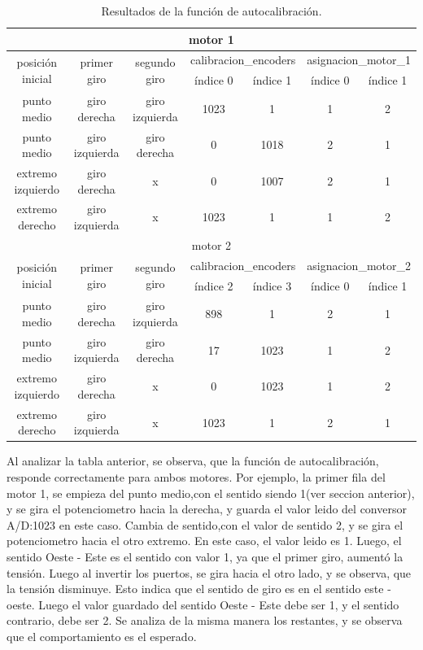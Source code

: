 \begin{table}[ht!]
	\begin{tabular}{|c|c|c|c|c|c|c|}
		\hline 
		\multicolumn{7}{|c|}{motor 1} \\
		\hline 
		\multirow{2}{*}{posición inicial} & 
		\multirow{2}{*}{primer giro} &\multirow{2}{*}{segundo giro} & \multicolumn{2}{l|}{calibracion\_encoders}& \multicolumn{2}{l|}{asignacion\_motor\_1} \\ \cline{4-7} 
		   & & & índice 0 &índice 1 &índice 0 &  índice 1 \\
		 \hline 
	      punto medio & giro derecha & giro izquierda & 1023 & 1 & 1 & 2 \\
	     \hline 
		 punto medio & giro izquierda & giro derecha & 0 & 1018 & 2 & 1 \\
		 \hline 	
		extremo izquierdo & giro derecha & x & 0 & 1007 & 2 & 1 \\
		\hline 
	    extremo derecho & giro izquierda & x & 1023 & 1 & 1 & 2 \\
		\hline 	
		\hline
		
		\multicolumn{7}{|c|}{motor 2} \\
		\hline 
		
		\multirow{2}{*}{posición inicial} & 
		\multirow{2}{*}{primer giro} &\multirow{2}{*}{segundo giro} & \multicolumn{2}{l|}{calibracion\_encoders}& \multicolumn{2}{l|}{asignacion\_motor\_2} \\ \cline{4-7} 
		   & & & índice 2 &índice 3 &índice 0 &  índice 1 \\ 
		\hline 
		 punto medio & giro derecha & giro izquierda & 898 & 1 & 2 & 1  \\
		\hline 
		 punto medio & giro izquierda & giro derecha & 17 & 1023 & 1 &2  \\
		\hline 	
		 extremo izquierdo & giro derecha & x & 0 & 1023 & 1 &2  \\
		\hline 
		 extremo derecho & giro izquierda & x & 1023 & 1 & 2 & 1 \\
		\hline
		\end{tabular}
	\caption{Resultados de la función de autocalibración.}
	\label{tab:resultados_autocalibracion}
\end{table}

Al analizar la tabla anterior, se observa, que la función de autocalibración, responde correctamente para ambos motores. Por ejemplo, la primer fila del motor 1, se empieza del punto medio,con el sentido siendo 1(ver seccion anterior), y se gira el potenciometro hacia la derecha, y guarda el valor leido del conversor A/D:1023 en este caso. Cambia de sentido,con el valor de sentido 2, y se gira el potenciometro hacia el otro extremo. En este caso, el valor leido es 1. Luego, el sentido Oeste - Este es el sentido con valor 1, ya que el primer giro, aumentó la tensión. Luego al invertir los puertos, se gira hacia el otro lado, y se observa, que la tensión disminuye. Esto indica que el sentido de giro es en el sentido este - oeste. Luego el valor guardado del sentido Oeste - Este debe ser 1, y el sentido contrario, debe ser 2. Se analiza de la misma manera los restantes, y se observa que el comportamiento es el esperado. 

